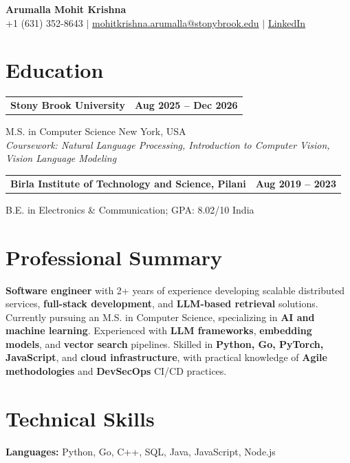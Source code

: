 \documentclass[letterpaper,10pt]{article}
\makeatletter
\newcommand{\entry}[2]{%
  \noindent
  \begin{tabularx}{\linewidth}
    {@{}>{\raggedright\arraybackslash}X@{\hspace{6pt}}r@{}}
    \textbf{#1} & #2
  \end{tabularx}\par
}
\makeatother
\begin{document}
\begin{center}
    {\LARGE\bfseries Arumalla Mohit Krishna}\\[3pt]
    +1 (631) 352-8643 $|$
    \href{mailto:mohitkrishna.arumalla@stonybrook.edu}
    {mohitkrishna.arumalla@stonybrook.edu} $|$
    \href{https://linkedin.com/in/mohit-krishna-arumalla}
    {LinkedIn}
\end{center}
\vspace{-8pt}

\section{Education}

\entry
  {\textbf{Stony Brook University}}
  {\textbf{Aug 2025 -- Dec 2026}}

M.S. in Computer Science \hfill New York, USA\\
\textit{
Coursework: Natural Language Processing,
Introduction to Computer Vision, Vision Language Modeling
}
\vspace{3pt}

\entry
  {\textbf{Birla Institute of Technology and Science, Pilani}}
  {\textbf{Aug 2019 -- 2023}}

B.E. in Electronics \& Communication; GPA: 8.02/10 \hfill India
\section{Professional Summary}

\textbf{Software engineer} with 2+ years of experience developing scalable distributed services, \textbf{full-stack development}, and \textbf{LLM-based retrieval} solutions. Currently pursuing an M.S. in Computer Science, specializing in \textbf{AI and machine learning}. Experienced with \textbf{LLM frameworks}, \textbf{embedding models}, and \textbf{vector search} pipelines. Skilled in \textbf{Python, Go, PyTorch, JavaScript}, and \textbf{cloud infrastructure}, with practical knowledge of \textbf{Agile methodologies} and \textbf{DevSecOps} CI/CD practices.

\section{Technical Skills}

\textbf{Languages:}
Python, Go, C++, SQL, Java, JavaScript, Node.js\\
\end{document}
